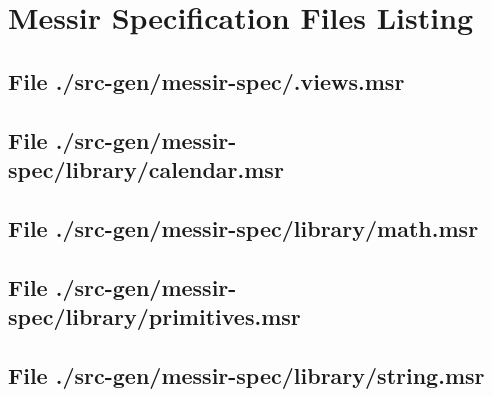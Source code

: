 \chapter{Messir Specification Files Listing}

\section[File /src-gen/messir-spec/.views.msr]{File ./src-gen/messir-spec/.views.msr}
\scriptsize

\normalsize
	
\section[File /src-gen/messir-spec/library/calendar.msr]{File ./src-gen/messir-spec/library/calendar.msr}
\scriptsize

\normalsize
	
\section[File /src-gen/messir-spec/library/math.msr]{File ./src-gen/messir-spec/library/math.msr}
\scriptsize

\normalsize
	
\section[File /src-gen/messir-spec/library/primitives.msr]{File ./src-gen/messir-spec/library/primitives.msr}
\scriptsize

\normalsize
	
\section[File /src-gen/messir-spec/library/string.msr]{File ./src-gen/messir-spec/library/string.msr}
\scriptsize

\normalsize
	
